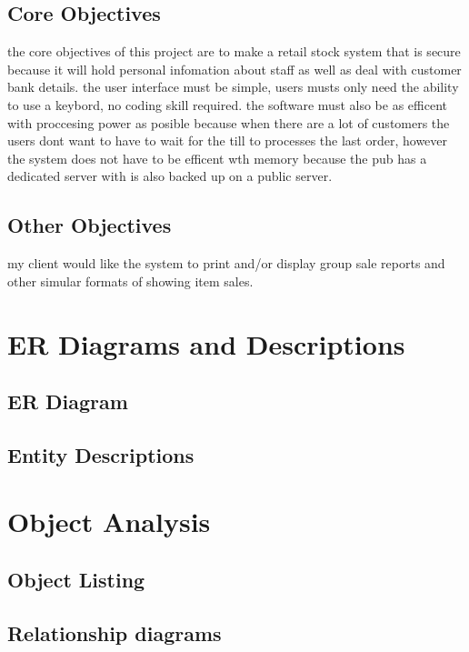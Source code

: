 \subsection{Core Objectives}

the core objectives of this project are to make a retail stock system that is secure because it will hold personal infomation about staff as well as deal with customer bank details. the user interface must be simple, users musts only need the ability to use a keybord, no coding skill required. the software must also be as efficent with proccesing power as posible because when there are a lot of customers the users dont want to have to wait for the till to processes the last order, however the system does not have to be efficent wth memory because the pub has a dedicated server with is also backed up on a public server.

\subsection{Other Objectives}

my client would like the system to print and/or display group sale reports and other simular formats of showing item sales.

\section{ER Diagrams and Descriptions}

\subsection{ER Diagram}

\subsection{Entity Descriptions}

\section{Object Analysis}

\subsection{Object Listing}

\subsection{Relationship diagrams}

